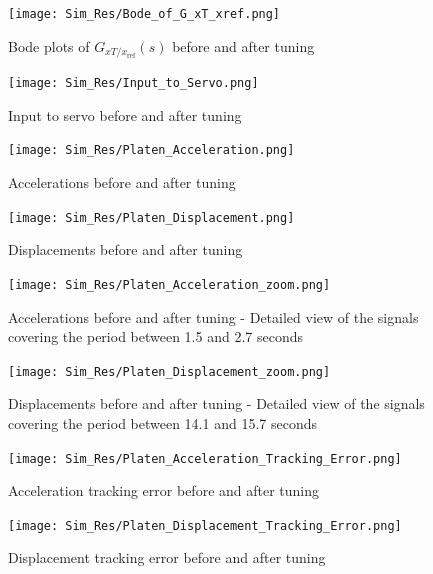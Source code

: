 \documentclass[9pt]{extarticle}
\begin{document}
\begin{figure}[H]
\begin{minipage}{0.49\textwidth}
    \centering
    \texttt{[image: Sim\_Res/Bode\_of\_G\_xT\_xref.png]}
    \caption{Bode plots of $G_ {xT/x_{\text{ref}}}(s)$ before and after tuning}
    \label{fig_Bode_of_G_xT_xref}    
\end{minipage}
\hfill
\begin{minipage}{0.49\textwidth}
    \centering
    \texttt{[image: Sim\_Res/Input\_to\_Servo.png]}
    \caption{Input to servo before and after tuning}
    \label{fig_Input_to_Servo}
\end{minipage}
\end{figure}


\begin{figure}[H]
\begin{minipage}{0.49\textwidth}
    \centering
    \texttt{[image: Sim\_Res/Platen\_Acceleration.png]}
    \caption{Accelerations before and after tuning}
    \label{fig_Platen_Acceleration}
\end{minipage}
\hfill
\begin{minipage}{0.49\textwidth}
    \centering
    \texttt{[image: Sim\_Res/Platen\_Displacement.png]}
    \caption{Displacements before and after tuning}
    \label{fig_Platen_Displacement}
\end{minipage}
\end{figure}

\begin{figure}[H]
\begin{minipage}{0.49\textwidth}
    \centering
    \texttt{[image: Sim\_Res/Platen\_Acceleration\_zoom.png]}
    \caption{Accelerations before and after tuning - Detailed view of the signals covering the period between 1.5 and 2.7 seconds}
    \label{fig_Platen_Acceleration_zoom}
\end{minipage}
\hfill
\begin{minipage}{0.49\textwidth}
    \centering
    \texttt{[image: Sim\_Res/Platen\_Displacement\_zoom.png]}
    \caption{Displacements before and after tuning - Detailed view of the signals covering the period between 14.1 and 15.7 seconds}
    \label{fig_Platen_Displacement_zoom}
\end{minipage}
\end{figure}

\begin{figure}[H]
\begin{minipage}{0.49\textwidth}
    \centering
    \texttt{[image: Sim\_Res/Platen\_Acceleration\_Tracking\_Error.png]}
    \caption{Acceleration tracking error before and after tuning}
    \label{fig_Platen_Acceleration_Tracking_Error}
\end{minipage}
\hfill
\begin{minipage}{0.49\textwidth}
    \centering
    \texttt{[image: Sim\_Res/Platen\_Displacement\_Tracking\_Error.png]}
    \caption{Displacement tracking error before and after tuning}
    \label{fig_Platen_Displacement_Tracking_Error}
\end{minipage}
\end{figure}
\end{document}
